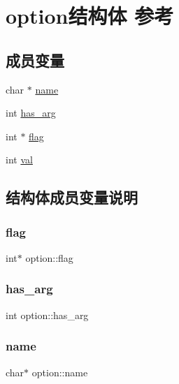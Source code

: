 \hypertarget{structoption}{}\section{option结构体 参考}
\label{structoption}
\subsection*{成员变量}
\begin{DoxyCompactItemize}
\item 
char $\ast$ \hyperlink{structoption_a92c850a23c7828c1dba453bf8d15e1f0}{name}
\item 
int \hyperlink{structoption_a90d7ee9a51eea5c002682dbd0af149e4}{has\+\_\+arg}
\item 
int $\ast$ \hyperlink{structoption_ab366eea5fe7be25c1928328ba715e353}{flag}
\item 
int \hyperlink{structoption_a13bd155ec3b405d29c41ab8d0793be11}{val}
\end{DoxyCompactItemize}


\subsection{结构体成员变量说明}
\mbox{\label{structoption_ab366eea5fe7be25c1928328ba715e353}} 
\subsubsection{\texorpdfstring{flag}{flag}}
{\footnotesize\ttfamily int$\ast$ option\+::flag}

\mbox{\label{structoption_a90d7ee9a51eea5c002682dbd0af149e4}} 
\subsubsection{\texorpdfstring{has\+\_\+arg}{has\_arg}}
{\footnotesize\ttfamily int option\+::has\+\_\+arg}

\mbox{\label{structoption_a92c850a23c7828c1dba453bf8d15e1f0}} 
\subsubsection{\texorpdfstring{name}{name}}
{\footnotesize\ttfamily char$\ast$ option\+::name}

